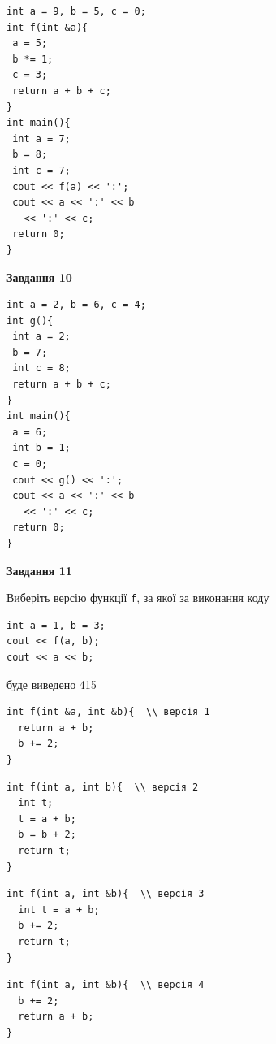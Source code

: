 \documentclass[12pt, ukrainian]{article}
\def\code#1{\Verb!#1!}
\begin{document}
{\begin {large}
\begin{minipage}[t]{7.0cm}
\begin{verbatim}
int a = 9, b = 5, c = 0;
int f(int &a){
 a = 5;
 b *= 1;
 c = 3;
 return a + b + c;
}
int main(){
 int a = 7;
 b = 8;
 int c = 7;
 cout << f(a) << ':';
 cout << a << ':' << b 
   << ':' << c;
 return 0;
}
\end{verbatim}



\begin{center}
\textbf{Завдання 10}
\end{center}
\vspace{-8mm}

\begin{verbatim}
int a = 2, b = 6, c = 4;
int g(){
 int a = 2;
 b = 7;
 int c = 8;
 return a + b + c;
}
int main(){
 a = 6;
 int b = 1;
 c = 0;
 cout << g() << ':';
 cout << a << ':' << b 
   << ':' << c;
 return 0;
}
\end{verbatim}

\end{minipage}
\vline \hspace{1mm}
\begin{minipage}[t]{11.0cm}

\begin{center}
\textbf{Завдання 11}
\end{center}
Виберіть версію функції \code{f}, за якої за виконання коду
\begin{verbatim}
int a = 1, b = 3;
cout << f(a, b);
cout << a << b;
\end{verbatim}

буде виведено 415

\begin{verbatim}
int f(int &a, int &b){  \\ версія 1
  return a + b;
  b += 2;
}
\end{verbatim}

\vspace{-8mm}\begin{verbatim}
int f(int a, int b){  \\ версія 2
  int t;
  t = a + b;
  b = b + 2;
  return t;
}
\end{verbatim}

\vspace{-8mm}\begin{verbatim}
int f(int a, int &b){  \\ версія 3
  int t = a + b;
  b += 2;
  return t;
}
\end{verbatim}

\vspace{-8mm}\begin{verbatim}
int f(int a, int &b){  \\ версія 4
  b += 2;
  return a + b;
}
\end{verbatim}




\end{minipage}
\end{large}}
\end{document}
